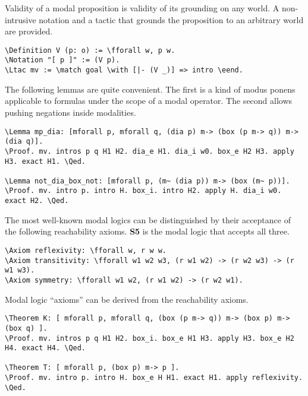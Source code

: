 \documentclass{llncs}
\newcommand{\red}[1]{\textcolor[rgb]{1,0,0}{#1}}
\newcommand{\blue}[1]{\textcolor[rgb]{0,0,1}{#1}}
\newcommand{\Ltac}{\red{Ltac}}
\newcommand{\Axiom}{\red{Axiom}}
\newcommand{\Lemma}{\red{Lemma}}
\newcommand{\Theorem}{\red{Theorem}}
\newcommand{\Definition}{\red{Definition}}
\newcommand{\Notation}{\blue{Notation}}
\newcommand{\match}{\blue{match}}
\newcommand{\with}{\blue{with}}
\newcommand{\eend}{\blue{end}}
\newcommand{\fforall}{\blue{forall}}
\newcommand{\Proof}{\blue{Proof}}
\newcommand{\Qed}{\blue{Qed}}
\begin{document}
\noindent
Validity of a modal proposition is validity of its grounding on any world. A non-intrusive notation and a tactic that grounds the proposition to an arbitrary world are provided.

\begin{Verbatim}[commandchars=\\\{\},fontsize=\verbsize]
\Definition V (p: o) := \fforall w, p w.
\Notation "[ p ]" := (V p).
\Ltac mv := \match goal \with [|- (V _)] => intro \eend.
\end{Verbatim}

\noindent
The following lemmas are quite convenient. The first is a kind of modus ponens applicable to formulas under the scope of a modal operator. The second allows pushing negations inside modalities.

\begin{Verbatim}[commandchars=\\\{\},fontsize=\verbsize]
\Lemma mp_dia: [mforall p, mforall q, (dia p) m-> (box (p m-> q)) m-> (dia q)].
\Proof. mv. intros p q H1 H2. dia_e H1. dia_i w0. box_e H2 H3. apply H3. exact H1. \Qed.

\Lemma not_dia_box_not: [mforall p, (m~ (dia p)) m-> (box (m~ p))].
\Proof. mv. intro p. intro H. box_i. intro H2. apply H. dia_i w0. exact H2. \Qed.
\end{Verbatim}

\noindent
The most well-known modal logics can be distinguished by their acceptance of the following reachability axioms. \textbf{S5} is the modal logic that accepts all three.

\begin{Verbatim}[commandchars=\\\{\},fontsize=\verbsize]
\Axiom reflexivity: \fforall w, r w w.
\Axiom transitivity: \fforall w1 w2 w3, (r w1 w2) -> (r w2 w3) -> (r w1 w3).
\Axiom symmetry: \fforall w1 w2, (r w1 w2) -> (r w2 w1).
\end{Verbatim}

\noindent
Modal logic ``axioms'' can be derived from the reachability axioms.

\begin{Verbatim}[commandchars=\\\{\},fontsize=\verbsize]
\Theorem K: [ mforall p, mforall q, (box (p m-> q)) m-> (box p) m-> (box q) ].
\Proof. mv. intros p q H1 H2. box_i. box_e H1 H3. apply H3. box_e H2 H4. exact H4. \Qed.

\Theorem T: [ mforall p, (box p) m-> p ].
\Proof. mv. intro p. intro H. box_e H H1. exact H1. apply reflexivity. \Qed.
\end{Verbatim}
\end{document}
